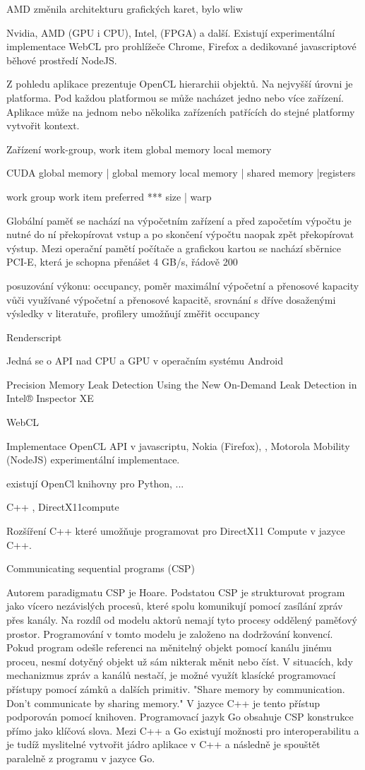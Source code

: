 \documentclass[10pt,draft,oneside]{fithesis2}
\begin{document}
AMD změnila architekturu grafických karet, bylo wliw

Nvidia, AMD (GPU i CPU), Intel, (FPGA) a další. Existují experimentální implementace WebCL pro prohlížeče Chrome, Firefox a dedikované javascriptové běhové prostředí NodeJS.

Z pohledu aplikace prezentuje OpenCL hierarchii objektů. Na nejvyšší úrovni je platforma. Pod každou platformou se může nacházet jedno nebo více zařízení. Aplikace může na jednom nebo několika zařízeních patřících do stejné platformy vytvořit kontext. 

Zařízení
work-group, work item
global memory
local memory

CUDA
global memory | global memory
local memory | shared memory
|registers

work group
work item
preferred *** size | warp

Globální paměť se nachází na výpočetním zařízení a před započetím výpočtu je nutné do ní překopírovat vstup a po skončení výpočtu naopak zpět překopírovat výstup. Mezi operační pamětí počítače a grafickou kartou se nachází sběrnice PCI-E, která je schopna přenášet 4 GB/s, řádově 200 

posuzování výkonu: occupancy, poměr maximální výpočetní a přenosové kapacity vůči využívané výpočetní a přenosové kapacitě, srovnání s dříve dosaženými výsledky v literatuře, profilery umožňují změřit occupancy

Renderscript

Jedná se o API nad CPU a GPU v operačním systému Android

Precision Memory Leak Detection Using the New On-Demand Leak Detection in Intel® Inspector XE

WebCL

Implementace OpenCL API v javascriptu, Nokia (Firefox), , Motorola Mobility (NodeJS) experimentální implementace.

existují OpenCl knihovny pro Python, ...

C++ , DirectX11compute

Rozšíření C++ které umožňuje programovat pro DirectX11 Compute v jazyce C++.

Communicating sequential programs (CSP)

Autorem paradigmatu CSP je Hoare. Podstatou CSP je strukturovat program jako vícero nezávislých procesů, které spolu komunikují pomocí zasílání zpráv přes kanály. Na rozdíl od modelu aktorů nemají tyto procesy oddělený paměťový prostor. Programování v tomto modelu je založeno na dodržování konvencí. Pokud program odešle referenci na měnitelný objekt pomocí kanálu jinému proceu, nesmí dotyčný objekt už sám nikterak měnit nebo číst. V situacích, kdy mechanizmus zpráv a kanálů nestačí, je možné využít klasícké programovací přístupy pomocí zámků a dalších primitiv. "Share memory by communication. Don't communicate by sharing memory." V jazyce C++ je tento přístup podporován pomocí knihoven. Programovací jazyk Go obsahuje CSP konstrukce přímo jako klíčová slova. Mezi C++ a Go existují možnosti pro interoperabilitu a je tudíž myslitelné vytvořit jádro aplikace v C++ a následně je spouštět paralelně z programu v jazyce Go.
\end{document}
